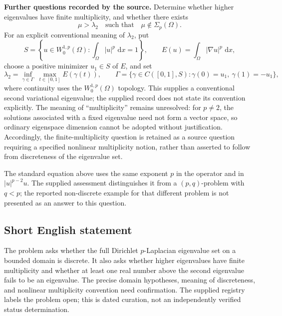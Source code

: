 \documentclass[11pt]{article}
\newcommand{\dd}{\,\mathrm{d}}
\begin{document}
\textbf{Further questions recorded by the source.} Determine whether higher eigenvalues have finite multiplicity, and whether there exists
\[
\mu>\lambda_2\quad\text{such that}\quad\mu\notin\Sigma_p(\Omega).
\]
For an explicit conventional meaning of \(\lambda_2\), put
\[
S=\left\{u\in W^{1,p}_0(\Omega):\int_\Omega |u|^p\,\dd x=1\right\},
\qquad E(u)=\int_\Omega |\nabla u|^p\,\dd x,
\]
choose a positive minimizer \(u_1\in S\) of \(E\), and set
\[
\lambda_2=\inf_{\gamma\in\Gamma}\ \max_{t\in[0,1]}E(\gamma(t)),\qquad
\Gamma=\{\gamma\in C([0,1],S):\gamma(0)=u_1,\ \gamma(1)=-u_1\},
\]
where continuity uses the \(W^{1,p}_0(\Omega)\) topology. This supplies a conventional second variational eigenvalue; the supplied record does not state its convention explicitly. The meaning of ``multiplicity'' remains unresolved: for \(p\neq2\), the solutions associated with a fixed eigenvalue need not form a vector space, so ordinary eigenspace dimension cannot be adopted without justification. Accordingly, the finite-multiplicity question is retained as a source question requiring a specified nonlinear multiplicity notion, rather than asserted to follow from discreteness of the eigenvalue set.

The standard equation above uses the same exponent \(p\) in the operator and in \(|u|^{p-2}u\). The supplied assessment distinguishes it from a \((p,q)\)-problem with \(q<p\); the reported non-discrete example for that different problem is not presented as an answer to this question.
\subsection{Short English statement}
The problem asks whether the full Dirichlet \(p\)-Laplacian eigenvalue set on a bounded domain is discrete. It also asks whether higher eigenvalues have finite multiplicity and whether at least one real number above the second eigenvalue fails to be an eigenvalue. The precise domain hypotheses, meaning of discreteness, and nonlinear multiplicity convention need confirmation. The supplied registry labels the problem open; this is dated curation, not an independently verified status determination.
\end{document}
